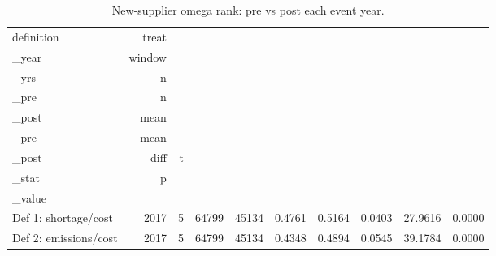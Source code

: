 \begin{table}[ht]
\centering
\caption{New-supplier omega rank: pre vs post each event year.} 
\begin{tabular}{lrrrrrrrrr}
  \toprule
definition & treat\\_year & window\\_yrs & n\\_pre & n\\_post & mean\\_pre & mean\\_post & diff & t\\_stat & p\\_value \\ 
  \midrule
Def 1: shortage/cost &  2017 &     5 & 64799 & 45134 & 0.4761 & 0.5164 & 0.0403 & 27.9616 & 0.0000 \\ 
  Def 2: emissions/cost &  2017 &     5 & 64799 & 45134 & 0.4348 & 0.4894 & 0.0545 & 39.1784 & 0.0000 \\ 
   \bottomrule
\end{tabular}
\end{table}
